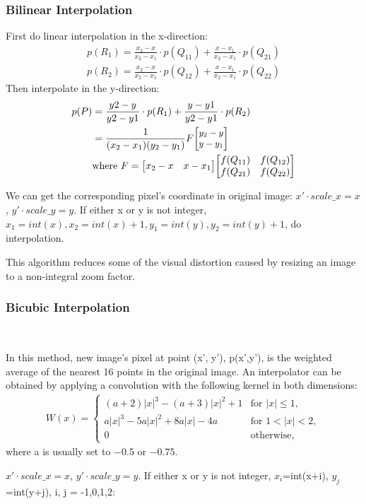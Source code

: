 \documentclass[journal,conference]{IEEEtran}
\begin{document}
\subsubsection{Bilinear Interpolation}
\par First do linear interpolation in the x-direction:
\begin{align*}
p(R_1) = \frac{x_2-x}{x_2-x_1}\cdot p(Q_{11})+\frac{x-x_1}{x_2-x_1}\cdot p(Q_{21})\\
p(R_2) = \frac{x_2-x}{x_2-x_1}\cdot p(Q_{12})+\frac{x-x_1}{x_2-x_1}\cdot p(Q_{22})
\end{align*}
Then interpolate in the y-direction:
\begin{align*}
p(P) &= \frac{y2-y}{y2-y1}\cdot p(R_1)+\frac{y-y1}{y2-y1}\cdot p(R_2)\\ &=\small{\frac {1}{(x_{2}-x_{1})(y_{2}-y_{1})}} F {\begin{bmatrix}y_{2}-y\\y-y_{1}\end{bmatrix}} \\
& \text{where } F = {\begin{bmatrix}x_{2}-x&x-x_{1}\end{bmatrix}}{\begin{bmatrix}f(Q_{11})&f(Q_{12})\\f(Q_{21})&f(Q_{22})\end{bmatrix}}
\end{align*}
\par We can get the corresponding pixel's coordinate in original image: $x'\cdot scale\_x=x$, $y'\cdot scale\_y=y$. If either x or y is not integer, $x_1=int(x),x_2=int(x)+1,y_1=int(y), y_2=int(y)+1$, do interpolation.
\par This algorithm reduces some of the visual distortion caused by resizing an image to a non-integral zoom factor.
~\\
\subsubsection{Bicubic Interpolation}
~\\
\par In this method, new image’s pixel at point (x', y'), p(x',y'), is the weighted average of the nearest 16 points in the original image. An interpolator can be obtained by applying a convolution with the following kernel in both dimensions:
\begin{align*}
{\displaystyle W(x)={\begin{cases}(a+2)|x|^{3}-(a+3)|x|^{2}+1&{\text{for }}|x|\leq 1,\\a|x|^{3}-5a|x|^{2}+8a|x|-4a&{\text{for }}1<|x|<2,\\0&{\text{otherwise}},\end{cases}}}
\end{align*}
where a is usually set to $-0.5$ or $-0.75$.
\par $x'\cdot scale\_x=x$, $y'\cdot scale\_y=y$. If either x or y is not integer, $x_i$=int(x+i), $y_j$=int(y+j), i, j = -1,0,1,2:
\end{document}
